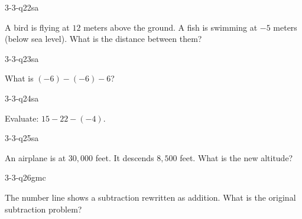 \begin{practiceQuestion}{3-3-q22}{sa}
\begin{questionText}
A bird is flying at $12$ meters above the ground. A fish is swimming at $-5$ meters (below sea level). What is the distance between them?
\end{questionText}
\end{practiceQuestion}

\begin{practiceQuestion}{3-3-q23}{sa}
\begin{questionText}
What is $(-6) - (-6) - 6$?
\end{questionText}
\end{practiceQuestion}

\begin{practiceQuestion}{3-3-q24}{sa}
\begin{questionText}
Evaluate: $15 - 22 - (-4)$.
\end{questionText}
\end{practiceQuestion}

\begin{practiceQuestion}{3-3-q25}{sa}
\begin{questionText}
An airplane is at $30{,}000$ feet. It descends $8{,}500$ feet. What is the new altitude?
\end{questionText}
\end{practiceQuestion}


\begin{practiceQuestion}{3-3-q26}{gmc}
\begin{questionText}
The number line shows a subtraction rewritten as addition. What is the original subtraction problem?

\begin{center}
\end{center}
\end{questionText}
\end{practiceQuestion}

